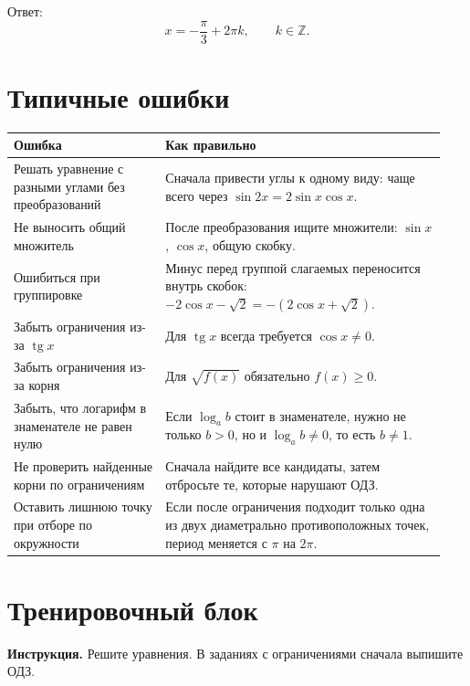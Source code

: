 \documentclass[a4paper,12pt]{article}
\providecommand{\tg}{\mathop{\mathrm{tg}}\nolimits}
\begin{document}
Ответ:
\[
x=-\frac{\pi}{3}+2\pi k,\qquad k\in\mathbb Z.
\]

\section{Типичные ошибки}

\begin{longtable}{@{}p{0.33\linewidth}p{0.61\linewidth}@{}}
\toprule
\textbf{Ошибка} & \textbf{Как правильно}\\
\midrule
Решать уравнение с разными углами без преобразований &
Сначала привести углы к одному виду: чаще всего через $\sin2x=2\sin x\cos x$.\\

Не выносить общий множитель &
После преобразования ищите множители: $\sin x$, $\cos x$, общую скобку.\\

Ошибиться при группировке &
Минус перед группой слагаемых переносится внутрь скобок: $-2\cos x-\sqrt2=-(2\cos x+\sqrt2)$.\\

Забыть ограничения из-за $\tg x$ &
Для $\tg x$ всегда требуется $\cos x\ne0$.\\

Забыть ограничения из-за корня &
Для $\sqrt{f(x)}$ обязательно $f(x)\ge0$.\\

Забыть, что логарифм в знаменателе не равен нулю &
Если $\log_a b$ стоит в знаменателе, нужно не только $b>0$, но и $\log_a b\ne0$, то есть $b\ne1$.\\

Не проверить найденные корни по ограничениям &
Сначала найдите все кандидаты, затем отбросьте те, которые нарушают ОДЗ.\\

Оставить лишнюю точку при отборе по окружности &
Если после ограничения подходит только одна из двух диаметрально противоположных точек, период меняется с $\pi$ на $2\pi$.\\
\bottomrule
\end{longtable}

\newpage

\section*{Тренировочный блок}

\textbf{Инструкция.} Решите уравнения. В заданиях с ограничениями сначала выпишите ОДЗ.
\end{document}
